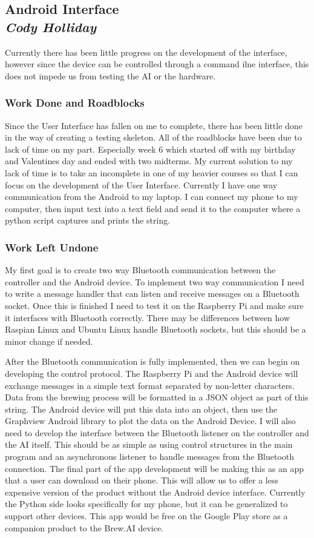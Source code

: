 \documentclass[draftclsnofoot,onecolumn,letterpaper,10pt]{IEEEtran}
\begin{document}
\subsection{Android Interface\\{\em\textbf{Cody Holliday}}}
Currently there has been little progress on the development of the interface, however since the device can be controlled through a command ilne interface, this does not impede us from testing the AI or the hardware.


\subsubsection{Work Done and Roadblocks}
Since the User Interface has fallen on me to complete, there has been little done in the way of creating a testing skeleton.
All of the roadblocks have been due to lack of time on my part. Especially week 6 which started off with my birthday
and Valentines day and ended with two midterms.
My current solution to my lack of time is to take an incomplete in one of my heavier courses so that I can focus on the development of the User Interface.
Currently I have one way communication from the Android to my laptop. I can connect my phone to my
computer, then input text into a text field and send it to the computer where a python script captures and prints the string.


\subsubsection{Work Left Undone}
My first goal is to create two way Bluetooth communication between the controller and the Android device.
To implement two way communication I need to write a message handler that can listen and receive messages on a Bluetooth socket.
Once this is finished I need to test it on the Raspberry Pi and make sure it interfaces with Bluetooth correctly.
There may be differences between how Raspian Linux and Ubuntu Linux handle Bluetooth sockets, but this should be
a minor change if needed.


After the Bluetooth communication is fully implemented, then we can begin on developing the control protocol.
The Raspberry Pi and the Android device will exchange messages in a simple text format separated by non-letter characters.
Data from the brewing process will be formatted in a JSON object as part of this string.
The Android device will put this data into an object, then use the Graphview Android library to plot the data on the Android Device.
I will also need to develop the interface between the Bluetooth listener on the controller and the AI itself.
This should be as simple as using control structures in the main program and an asynchronous listener to handle messages from the Bluetooth connection.
The final part of the app development will be making this as an app that a user can download on their phone.
This will allow us to offer a less expensive version of the product without the Android device interface.
Currently the Python side looks specifically for my phone, but it can be generalized to support other devices.
This app would be free on the Google Play store as a companion product to the Brew.AI device.
\end{document}
